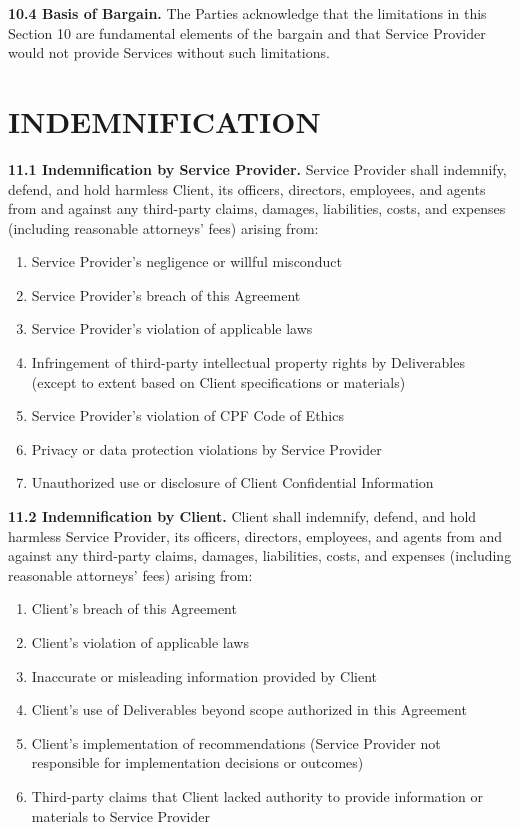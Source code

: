 \documentclass[11pt,a4paper]{article}
\begin{document}
\textbf{10.4 Basis of Bargain.} The Parties acknowledge that the limitations in this Section 10 are fundamental elements of the bargain and that Service Provider would not provide Services without such limitations.

\section{INDEMNIFICATION}

\textbf{11.1 Indemnification by Service Provider.} Service Provider shall indemnify, defend, and hold harmless Client, its officers, directors, employees, and agents from and against any third-party claims, damages, liabilities, costs, and expenses (including reasonable attorneys' fees) arising from:

\begin{enumerate}[label=\alph*)]
\item Service Provider's negligence or willful misconduct
\item Service Provider's breach of this Agreement
\item Service Provider's violation of applicable laws
\item Infringement of third-party intellectual property rights by Deliverables (except to extent based on Client specifications or materials)
\item Service Provider's violation of CPF Code of Ethics
\item Privacy or data protection violations by Service Provider
\item Unauthorized use or disclosure of Client Confidential Information
\end{enumerate}

\textbf{11.2 Indemnification by Client.} Client shall indemnify, defend, and hold harmless Service Provider, its officers, directors, employees, and agents from and against any third-party claims, damages, liabilities, costs, and expenses (including reasonable attorneys' fees) arising from:

\begin{enumerate}[label=\alph*)]
\item Client's breach of this Agreement
\item Client's violation of applicable laws
\item Inaccurate or misleading information provided by Client
\item Client's use of Deliverables beyond scope authorized in this Agreement
\item Client's implementation of recommendations (Service Provider not responsible for implementation decisions or outcomes)
\item Third-party claims that Client lacked authority to provide information or materials to Service Provider
\end{enumerate}
\end{document}

